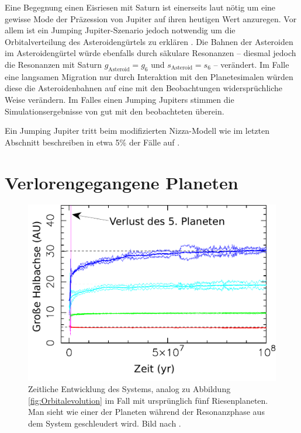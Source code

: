 \documentclass[12pt,a4paper,twoside,open=right,bibliography=totoc]{scrbook}
\renewcommand{\cite}{ \citep}
\begin{document}
Eine Begegnung einen Eisriesen mit Saturn ist einerseits laut \cite{Morbidelli2009} nötig um eine gewisse Mode der Präzession von Jupiter auf ihren heutigen Wert anzuregen. %
Vor allem ist ein Jumping Jupiter-Szenario jedoch notwendig um die Orbitalverteilung des Asteroidengürtels zu erklären\cite{Morbidelli2010}. Die Bahnen der Asteroiden im Asteroidengürtel würde ebenfalls durch säkulare Resonanzen -- diesmal jedoch die Resonanzen mit Saturn $g_\mathrm{Asteroid}=g_6$ und $s_\mathrm{Asteroid}=s_6$ -- verändert. Im Falle eine langsamen Migration nur durch Interaktion mit den Planetesimalen würden diese die Asteroidenbahnen auf eine mit den Beobachtungen widersprüchliche Weise verändern. Im Falles einen Jumping Jupiters stimmen die Simulationsergebnisse von \cite{Morbidelli2010} gut mit den beobachteten überein.

Ein Jumping Jupiter tritt beim modifizierten Nizza-Modell wie im letzten Abschnitt beschreiben in etwa 5\% der Fälle auf\cite{Brasser2009}.

\section{Verlorengegangene Planeten}
\begin{figure}[tbhn]
\centering
\includegraphics[scale=0.5]{img/Nesvorny2011-1.pdf}
\caption{Zeitliche Entwicklung des Systems, analog zu Abbildung \ref{fig:Orbitalevolution} im Fall mit ursprünglich fünf Riesenplaneten. Man sieht wie einer der Planeten während der Resonanzphase aus dem System geschleudert wird. Bild nach \cite{Nesvorny2011}. }
\label{fig:5planeten}
\end{figure}
\end{document}
